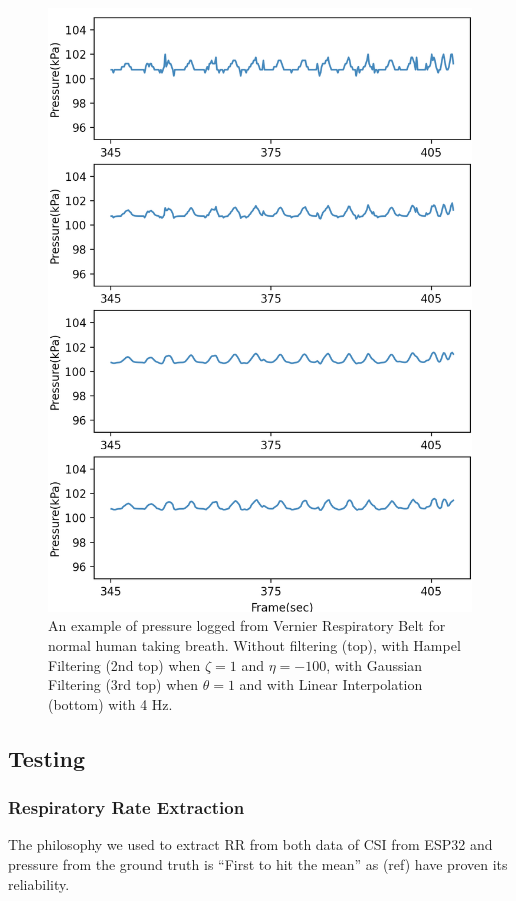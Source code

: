 \documentclass[10pt,letterpaper]{article}
\begin{document}
		
		\begin{figure}[htbp]
			\centerline{\includegraphics[width=120mm,scale=0.9]{FILGT_R2H2G2L.png}}
			\caption{An example of pressure logged from Vernier Respiratory Belt for normal human taking breath. Without filtering (top), with Hampel Filtering (2nd top) when  $\zeta=1$ and $\eta=-100$, with Gaussian Filtering (3rd top) when  $\theta=1$ and with Linear Interpolation (bottom) with 4 Hz.}
			\label{fig:FILGT_R2H2G2L}
		\end{figure}
		
	\subsection*{Testing}
	
	\subsubsection*{Respiratory Rate Extraction}
		
		The philosophy we used to extract RR from both data of CSI from ESP32 and pressure from the ground truth is ``First to hit the mean'' as (ref) have proven its reliability.
		
\end{document}
